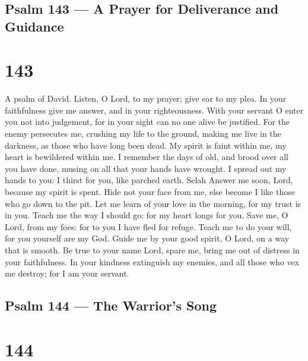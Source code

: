 \hypertarget{psalm-143-a-prayer-for-deliverance-and-guidance}{%
\subsection{Psalm 143 --- A Prayer for Deliverance and
Guidance}\label{psalm-143-a-prayer-for-deliverance-and-guidance}}

\hypertarget{section-142}{%
\section{143}\label{section-142}}

A psalm of David.  Listen, O Lord, to my prayer; give ear to
my plea. In your faithfulness give me answer, and in your righteousness.
 With your servant O enter you not into judgement, for in
your sight can no one alive be justified.  For the enemy
persecutes me, crushing my life to the ground, making me live in the
darkness, as those who have long been dead.  My spirit is
faint within me, my heart is bewildered within me.  I
remember the days of old, and brood over all you have done, musing on
all that your hands have wrought.  I spread out my hands to
you: I thirst for you, like parched earth. Selah  Answer me
soon, Lord, because my spirit is spent. Hide not your face from me, else
become I like those who go down to the pit.  Let me learn of
your love in the morning, for my trust is in you. Teach me the way I
should go: for my heart longs for you.  Save me, O Lord,
from my foes: for to you I have fled for refuge.  Teach me
to do your will, for you yourself are my God. Guide me by your good
spirit, O Lord, on a way that is smooth.  Be true to your
name Lord, spare me, bring me out of distress in your faithfulness.
 In your kindness extinguish my enemies, and all those who
vex me destroy; for I am your servant.

\hypertarget{psalm-144-the-warriors-song}{%
\subsection{Psalm 144 --- The Warrior's
Song}\label{psalm-144-the-warriors-song}}

\hypertarget{section-143}{%
\section{144}\label{section-143}}

